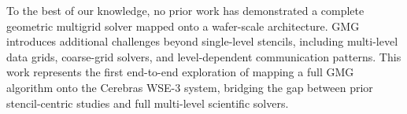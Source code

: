 \documentclass[sigconf]{acmart}
\begin{document}
To the best of our knowledge, no prior work has demonstrated a complete geometric multigrid solver mapped onto a wafer-scale architecture. GMG introduces additional challenges beyond single-level stencils, including multi-level data grids, coarse-grid solvers, and level-dependent communication patterns. This work represents the first end-to-end exploration of mapping a full GMG algorithm onto the Cerebras WSE-3 system, bridging the gap between prior stencil-centric studies and full multi-level scientific solvers.

\end{document}
